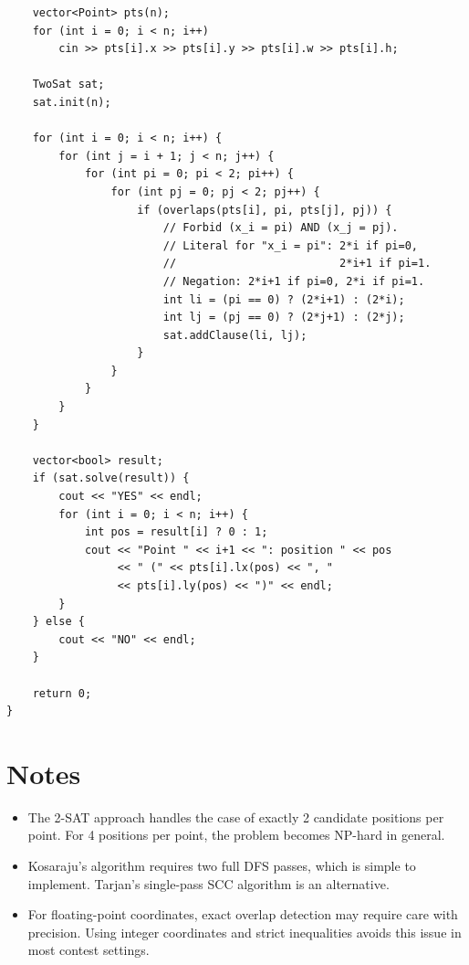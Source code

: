 \documentclass[11pt,a4paper]{article}
\begin{document}
\begin{lstlisting}
    vector<Point> pts(n);
    for (int i = 0; i < n; i++)
        cin >> pts[i].x >> pts[i].y >> pts[i].w >> pts[i].h;

    TwoSat sat;
    sat.init(n);

    for (int i = 0; i < n; i++) {
        for (int j = i + 1; j < n; j++) {
            for (int pi = 0; pi < 2; pi++) {
                for (int pj = 0; pj < 2; pj++) {
                    if (overlaps(pts[i], pi, pts[j], pj)) {
                        // Forbid (x_i = pi) AND (x_j = pj).
                        // Literal for "x_i = pi": 2*i if pi=0,
                        //                         2*i+1 if pi=1.
                        // Negation: 2*i+1 if pi=0, 2*i if pi=1.
                        int li = (pi == 0) ? (2*i+1) : (2*i);
                        int lj = (pj == 0) ? (2*j+1) : (2*j);
                        sat.addClause(li, lj);
                    }
                }
            }
        }
    }

    vector<bool> result;
    if (sat.solve(result)) {
        cout << "YES" << endl;
        for (int i = 0; i < n; i++) {
            int pos = result[i] ? 0 : 1;
            cout << "Point " << i+1 << ": position " << pos
                 << " (" << pts[i].lx(pos) << ", "
                 << pts[i].ly(pos) << ")" << endl;
        }
    } else {
        cout << "NO" << endl;
    }

    return 0;
}
\end{lstlisting}

\section{Notes}

\begin{itemize}
  \item The 2-SAT approach handles the case of exactly 2 candidate positions
    per point. For 4 positions per point, the problem becomes NP-hard in
    general.
  \item Kosaraju's algorithm requires two full DFS passes, which is simple
    to implement. Tarjan's single-pass SCC algorithm is an alternative.
  \item For floating-point coordinates, exact overlap detection may require
    care with precision. Using integer coordinates and strict inequalities
    avoids this issue in most contest settings.
\end{itemize}
\end{document}
